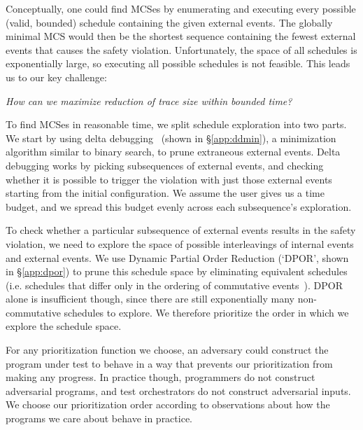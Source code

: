 
Conceptually, one could find MCSes by enumerating and executing every possible
(valid, bounded) schedule containing the given external events. The globally minimal MCS would
then be the shortest sequence containing
the fewest external events that causes the safety violation. Unfortunately, the space of all
schedules is exponentially large, so executing all possible schedules is not feasible.
This leads us to our key challenge:

\begin{displayquote}
{\em How can we maximize reduction of trace size within bounded time?}
\end{displayquote}


To find MCSes in reasonable time, we split schedule exploration into two
parts. We start by using delta debugging~\cite{Zeller:2002:SIF:506201.506206}
(shown in \S\ref{app:ddmin}), a minimization
algorithm similar to binary search, to prune extraneous external events. Delta debugging works by picking subsequences of external events, and checking whether
it is possible to trigger the violation with just those external
events starting from the initial configuration. We assume the user gives us a time budget, and we spread this budget evenly across each subsequence's exploration.

To check whether a particular subsequence of external events results in the safety violation,
we need to explore the space of possible interleavings of internal events and external events.
We use Dynamic Partial Order Reduction (`DPOR', shown in \S\ref{app:dpor}) to prune this schedule space by eliminating equivalent schedules (i.e. schedules
that differ only in the ordering of commutative
events~\cite{flanagan2005dynamic}). DPOR alone is insufficient though, since
there are still exponentially many non-commutative schedules to explore.
We therefore prioritize the order in which we explore the schedule space.

For any prioritization function we choose, an adversary could construct
the program under test to behave in a way that prevents our prioritization
from making any progress. In practice though,
programmers do not construct adversarial programs, and test orchestrators do not construct adversarial inputs. We choose our
prioritization order according to observations about how the programs we
care about behave in practice.

